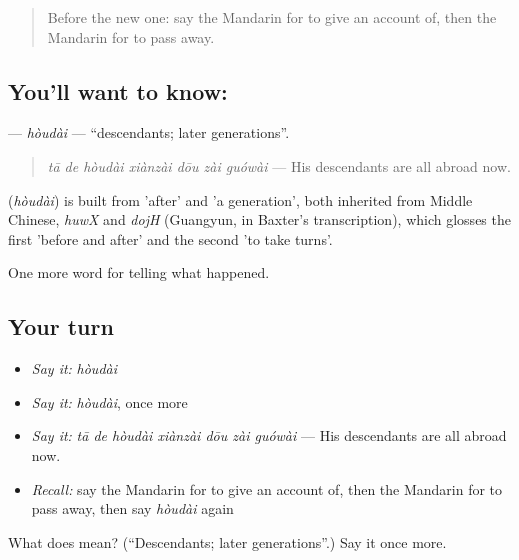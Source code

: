 \label{lesson:ZH-C325-houdai}



\begin{quote}
Before the new one: say the Mandarin for to give an account of, then the Mandarin for to pass away.
\end{quote}

\subsection*{You'll want to know: }
\textbf{} — \emph{hòudài} — \textquotedblleft{}descendants; later generations\textquotedblright{}.

\begin{quote}
\textbf{} \emph{tā de hòudài xiànzài dōu zài guówài} — His descendants are all abroad now.
\end{quote}

\begin{cousinweb}
\textbf{} (\emph{hòudài}) is built from  'after' and  'a generation', both inherited from Middle Chinese, \emph{huwX} and \emph{dojH} (Guangyun, in Baxter's transcription), which glosses the first 'before and after' and the second 'to take turns'.
\end{cousinweb}

\begin{grammarlens}[title={What you've built}]
One more word for telling what happened.
\end{grammarlens}

\subsection*{Your turn}
\begin{itemize}
\raggedright
  \item \emph{Say it:} \emph{hòudài}
  \item \emph{Say it:} \emph{hòudài}, once more
  \item \emph{Say it:} \emph{tā de hòudài xiànzài dōu zài guówài} — His descendants are all abroad now.
  \item \emph{Recall:} say the Mandarin for to give an account of, then the Mandarin for to pass away, then say \emph{hòudài} again
\end{itemize}

\begin{tcolorbox}[breakable,colback=teal!4,colframe=teal!35!black,title={Before you move on}]
What does  mean? (\textquotedblleft{}Descendants; later generations\textquotedblright{}.) Say it once more.
\end{tcolorbox}

